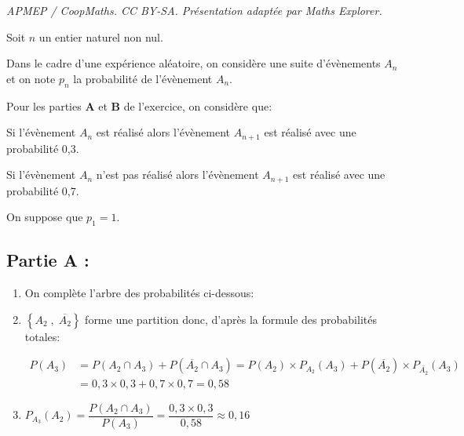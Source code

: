 \documentclass[10pt]{article}
\providecommand{\blue}{\color{blue}}
\providecommand{\blue}{\color{blue}}
\begin{document}
\noindent\textit{APMEP / CoopMaths. CC BY-SA. Présentation adaptée par Maths Explorer.}\par\medskip
Soit $n$ un entier naturel non nul.

Dans le cadre d'une expérience aléatoire, on considère une suite d'évènements $A_{n}$ et on note $p_{n}$ la probabilité de l'évènement $A_{n}$.

\begin{list}{\textbullet}{Pour les parties \textbf{A} et \textbf{B} de l'exercice, on considère que:}
\item Si l'évènement $A_{n}$ est réalisé alors l'évènement $A_{n+1}$ est réalisé avec une probabilité 0,3.
\item Si l'évènement $A_{n}$ n'est pas réalisé alors l'évènement $A_{n+1}$ est réalisé avec une probabilité 0,7.
\end{list}

On suppose que $p_{1}=1$.

\subsection*{Partie A :}

\begin{enumerate}
\item On complète l'arbre des probabilités ci-dessous:

\begin{center}
\bigskip
{}
{
	\pstree{\TR{$A_2$}\naput{\blue $0,3$}}
	{
		\naput{\blue $0,3$}
		\nbput{\blue $0,7$}
	}
	{
		\naput{\blue $0,7$}
		\nbput{\blue $0,3$}
	}
}
\bigskip
\end{center}

\item 
$\left \{ A_2\;,\; \overline{A_2} \right \}$ forme une partition donc, d'après la formule des probabilités totales:

$\begin{aligned}
P\left (A_3\right )
& = P\left (A_2 \cap A_3\right ) +P\left (\overline{A_2} \cap A_3\right )
= P\left (A_2\right ) \times P_{A_2}\left (A_3\right ) + P\left (\overline{ A_2} \right ) \times P_{\overline{ A_2} }\left (A_3\right )\\
& = 0,3\times 0,3+0,7\times 0,7 = 0,58
\end{aligned}$

\item 
$P_{A_{3}}\left(A_{2}\right) = \dfrac{P\left (A_2 \cap A_3\right )}{P\left ( A_3\right )}
= \dfrac{0,3\times 0,3}{0,58}\approx 0,16$
\end{enumerate}
\end{document}
